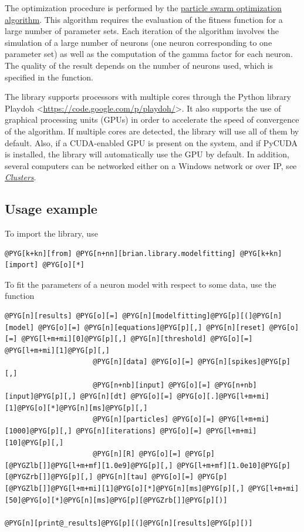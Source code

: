 \documentclass[letterpaper,10pt,english]{manual}
\begin{document}
The optimization procedure is performed by the
\href{http://en.wikipedia.org/wiki/Particle\_swarm\_optimization}{particle swarm optimization algorithm}.
This algorithm requires the evaluation of the fitness function for a large number of parameter
sets. Each iteration of the algorithm
involves the simulation of a large number of neurons (one neuron corresponding to one parameter set)
as well as the computation of the gamma factor for each neuron.
The quality of the result depends
on the number of neurons used, which is specified in the \hyperlink{brian.library.modelfitting.modelfitting}{} function.

The library supports processors with multiple cores through the Python library Playdoh
\textless{}\href{https://code.google.com/p/playdoh/}{https://code.google.com/p/playdoh/}\textgreater{}. It also supports the use of graphical processing
units (GPUs) in order to accelerate the speed of convergence of the algorithm.
If multiple cores are detected, the library will use all of them by default.
Also, if a CUDA-enabled GPU is present on the system, and if PyCUDA is installed,
the library will automatically use the GPU by default. In addition, several computers
can be networked either on a Windows network or over IP, see \hyperlink{modelfitting-clusters}{\emph{Clusters}}.


\subsection{Usage example}

To import the library, use

\begin{Verbatim}[commandchars=@\[\]]
@PYG[k+kn][from] @PYG[n+nn][brian.library.modelfitting] @PYG[k+kn][import] @PYG[o][*]
\end{Verbatim}

To fit the parameters of a neuron model with respect to some data, use the
\hyperlink{brian.library.modelfitting.modelfitting}{} function

\begin{Verbatim}[commandchars=@\[\]]
@PYG[n][results] @PYG[o][=] @PYG[n][modelfitting]@PYG[p][(]@PYG[n][model] @PYG[o][=] @PYG[n][equations]@PYG[p][,] @PYG[n][reset] @PYG[o][=] @PYG[l+m+mi][0]@PYG[p][,] @PYG[n][threshold] @PYG[o][=] @PYG[l+m+mi][1]@PYG[p][,]
                     @PYG[n][data] @PYG[o][=] @PYG[n][spikes]@PYG[p][,]
                     @PYG[n+nb][input] @PYG[o][=] @PYG[n+nb][input]@PYG[p][,] @PYG[n][dt] @PYG[o][=] @PYG[o][.]@PYG[l+m+mi][1]@PYG[o][*]@PYG[n][ms]@PYG[p][,]
                     @PYG[n][particles] @PYG[o][=] @PYG[l+m+mi][1000]@PYG[p][,] @PYG[n][iterations] @PYG[o][=] @PYG[l+m+mi][10]@PYG[p][,]
                     @PYG[n][R] @PYG[o][=] @PYG[p][@PYGZlb[]]@PYG[l+m+mf][1.0e9]@PYG[p][,] @PYG[l+m+mf][1.0e10]@PYG[p][@PYGZrb[]]@PYG[p][,] @PYG[n][tau] @PYG[o][=] @PYG[p][@PYGZlb[]]@PYG[l+m+mi][1]@PYG[o][*]@PYG[n][ms]@PYG[p][,] @PYG[l+m+mi][50]@PYG[o][*]@PYG[n][ms]@PYG[p][@PYGZrb[]]@PYG[p][)]

@PYG[n][print@_results]@PYG[p][(]@PYG[n][results]@PYG[p][)]
\end{Verbatim}
\end{document}
